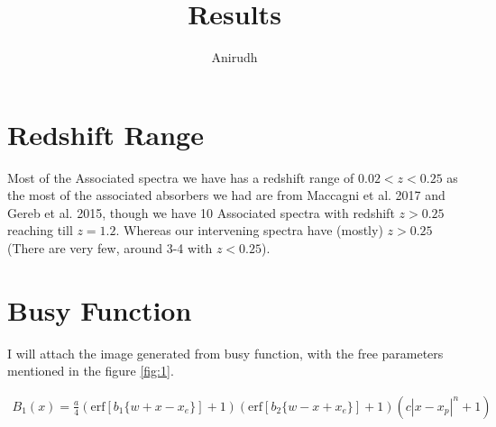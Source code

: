 \documentclass{article}
\title{Results} %
\author{Anirudh}%
\begin{document}
\maketitle %


\section*{Redshift Range} %

Most of the Associated spectra we have has a redshift range of $ 0.02 < z < 0.25$ as the most of the associated absorbers we had are from Maccagni et al. 2017 and Gereb et al. 2015, though we have 10 Associated spectra with redshift $z > 0.25$ reaching till $z = 1.2$. Whereas our intervening spectra have (mostly) $z >0.25$ (There are very few, around 3-4 with $z < 0.25$).

\section*{Busy Function} %

I will attach the image generated from busy function, with the free parameters mentioned in the figure \ref{fig:1}.

\begin{equation} \label{eq1}
\begin{aligned}
    B_1(x) = \frac{a}{4}\left( \text{erf}[b_1\{w + x - x_e\}] + 1\right) \left( \text{erf}[b_2\{w - x + x_e\}] + 1\right) \left( c|x - x_p|^n + 1 \right)
\end{aligned}
\end{equation}
\end{document}
